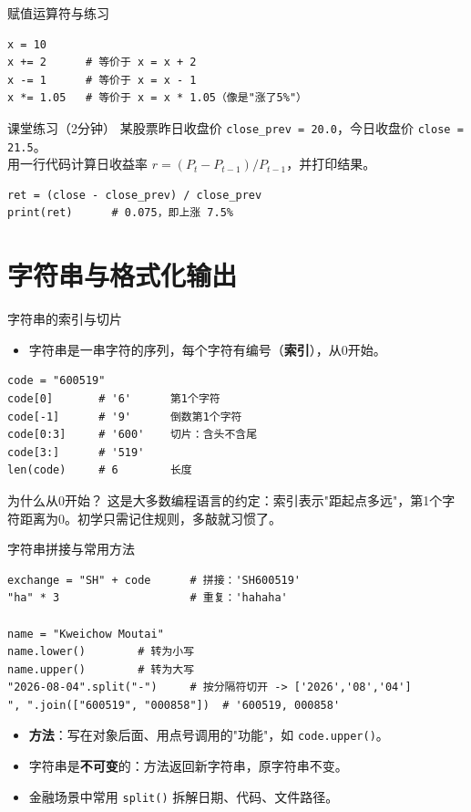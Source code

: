 \documentclass[9pt]{ctexbeamer}
\begin{document}
\begin{frame}[fragile]{赋值运算符与练习}
	\begin{lstlisting}
x = 10
x += 2      # 等价于 x = x + 2
x -= 1      # 等价于 x = x - 1
x *= 1.05   # 等价于 x = x * 1.05（像是"涨了5%"）
\end{lstlisting}
	\begin{exampleblock}{课堂练习（2分钟）}
		某股票昨日收盘价 \texttt{close\_prev = 20.0}，今日收盘价 \texttt{close = 21.5}。\\
		用一行代码计算日收益率 $r = (P_t - P_{t-1})/P_{t-1}$，并打印结果。
	\end{exampleblock}
	\begin{lstlisting}
ret = (close - close_prev) / close_prev
print(ret)      # 0.075，即上涨 7.5%
\end{lstlisting}
\end{frame}


\section{字符串与格式化输出}

\begin{frame}[fragile]{字符串的索引与切片}
	\begin{itemize}
		\item 字符串是一串字符的序列，每个字符有编号（\textbf{索引}），\alert{从0开始}。
	\end{itemize}
	\begin{lstlisting}
code = "600519"
code[0]       # '6'      第1个字符
code[-1]      # '9'      倒数第1个字符
code[0:3]     # '600'    切片：含头不含尾
code[3:]      # '519'
len(code)     # 6        长度
\end{lstlisting}
	\begin{alertblock}{为什么从0开始？}
		这是大多数编程语言的约定：索引表示"距起点多远"，第1个字符距离为0。初学只需记住规则，多敲就习惯了。
	\end{alertblock}
\end{frame}

\begin{frame}[fragile]{字符串拼接与常用方法}
	\begin{lstlisting}
exchange = "SH" + code      # 拼接：'SH600519'
"ha" * 3                    # 重复：'hahaha'

name = "Kweichow Moutai"
name.lower()        # 转为小写
name.upper()        # 转为大写
"2026-08-04".split("-")     # 按分隔符切开 -> ['2026','08','04']
", ".join(["600519", "000858"])  # '600519, 000858'
\end{lstlisting}
	\begin{itemize}
		\item \textbf{方法}：写在对象后面、用点号调用的"功能"，如 \texttt{code.upper()}。
		\item 字符串是\textbf{不可变}的：方法返回新字符串，原字符串不变。
		\item 金融场景中常用 \texttt{split()} 拆解日期、代码、文件路径。
	\end{itemize}
\end{frame}
\end{document}
